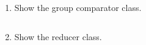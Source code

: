 \documentclass[11pt]{article}
\begin{document}
\begin{enumerate}
\begin{enumerate}
\begin{lstlisting}
\end{lstlisting}

			\item Show the group comparator class.

\begin{lstlisting}
\end{lstlisting}

			\item Show the reducer class.

\begin{lstlisting}
\end{lstlisting}
		\end{enumerate}
\end{enumerate}
\end{document}
